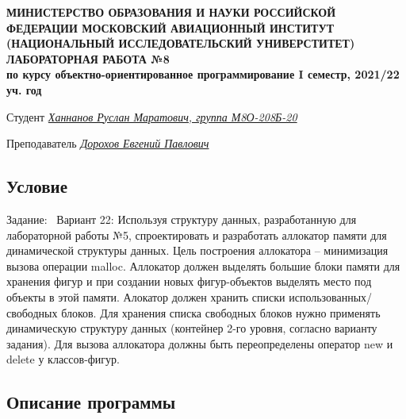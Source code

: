 \documentclass[12pt]{article}
\begin{document}
\begin{titlepage}
\begin{center}
\textbf{МИНИСТЕРСТВО ОБРАЗОВАНИЯ И НАУКИ РОССИЙСКОЙ ФЕДЕРАЦИИ
\medskip
МОСКОВСКИЙ АВИАЦИОННЫЙ ИНСТИТУТ
(НАЦИОНАЛЬНЫЙ ИССЛЕДОВАТЕЛЬСКИЙ УНИВЕРСТИТЕТ)
\vfill\vfill
{\Huge ЛАБОРАТОРНАЯ РАБОТА №8} \\
по курсу объектно-ориентированное программирование
I семестр, 2021/22 уч. год}
\end{center}
\vfill

Студент \uline{\it {Ханнанов Руслан Маратович, группа М8О-208Б-20}\hfill}

Преподаватель \uline{\it {Дорохов Евгений Павлович}\hfill}

\vfill
\end{titlepage}

\subsection*{Условие}

Задание: \
Вариант 22: Используя структуру данных, разработанную для лабораторной работы №5, спроектировать и 
разработать аллокатор памяти для динамической структуры данных.
Цель построения аллокатора – минимизация вызова операции malloc. Аллокатор должен 
выделять большие блоки памяти для хранения фигур и при создании новых фигур-объектов 
выделять место под объекты в этой памяти.
Алокатор должен хранить списки использованных/свободных блоков. Для хранения списка 
свободных блоков нужно применять динамическую структуру данных (контейнер 2-го уровня, 
согласно варианту задания).
Для вызова аллокатора должны быть переопределены оператор new и delete у классов-фигур.

\subsection*{Описание программы}
\end{document}
